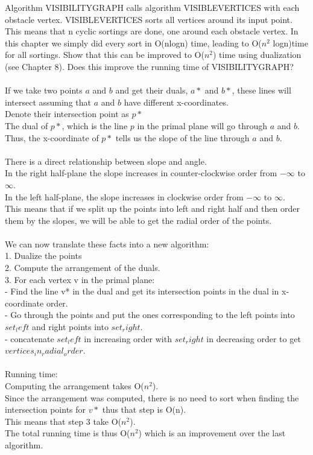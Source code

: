 \documentclass[11pt,psfig]{article}
\begin{document}
Algorithm VISIBILITYGRAPH calls algorithm VISIBLEVERTICES with
each obstacle vertex. VISIBLEVERTICES sorts all vertices around its
input point. This means that n cyclic sortings are done, one around each
obstacle vertex. In this chapter we simply did every sort in O(nlogn)
time, leading to O($n^2$ logn)time for all sortings. Show that this can be
improved to O($n^2$) time using dualization (see Chapter 8). Does this
improve the running time of VISIBILITYGRAPH?\\
\\
If we take two points $a$ and $b$ and get their duals, $a*$ and $b*$, these lines will intersect assuming that $a$ and $b$ have different x-coordinates. \\
Denote their intersection point as $p*$\\
The dual of $p*$, which is the line $p$ in the primal plane will go through $a$ and $b$. \\
Thus, the x-coordinate of $p*$ tells us the slope of the line through $a$ and $b$. \\
\\
There is a direct relationship between slope and angle. \\
In the right half-plane the slope increases in counter-clockwise order from $-\infty$ to $\infty$. \\
In the left half-plane, the slope increases in clockwise order from $-\infty$ to $\infty$. \\
This means that if we split up the points into left and right half and then order them by the slopes, we will be able to get the radial order of the points. \\
\\
We can now translate these facts into a new algorithm:\\
1. Dualize the points\\
2. Compute the arrangement of the duals. \\
3. For each vertex v in the primal plane:\\
- Find the line v* in the dual and get its intersection points in the dual in x-coordinate order. \\
- Go through the points and put the ones corresponding to the left points into $set_left$ and right points into $set_right$. \\
- concatenate $set_left$ in increasing order with $set_right$ in decreasing order to get $vertices_in_radial_order$. \\
\\
Running time:\\
Computing the arrangement takes O($n^2$). \\
Since the arrangement was computed, there is no need to sort when finding the intersection points for $v*$ thus that step is O(n). \\
This means that step 3 take O($n^2$). \\
The total running time is thus O($n^2$) which is an improvement over the last algorithm. 
\end{document}

